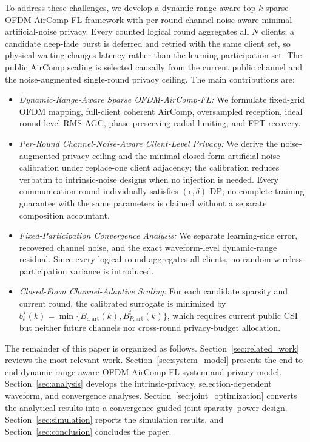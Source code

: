 \documentclass[journal]{IEEEtran}
\begin{document}
To address these challenges, we develop a dynamic-range-aware top-$k$ sparse OFDM-AirComp-FL framework with per-round channel-noise-aware minimal-artificial-noise privacy. Every counted logical round aggregates all $N$ clients; a candidate deep-fade burst is deferred and retried with the same client set, so physical waiting changes latency rather than the learning participation set. The public AirComp scaling is selected causally from the current public channel and the noise-augmented single-round privacy ceiling. The main contributions are:
\begin{itemize}
\item \emph{Dynamic-Range-Aware Sparse OFDM-AirComp-FL:} We formulate fixed-grid OFDM mapping, full-client coherent AirComp, oversampled reception, ideal round-level RMS-AGC, phase-preserving radial limiting, and FFT recovery.
\item \emph{Per-Round Channel-Noise-Aware Client-Level Privacy:} We derive the noise-augmented privacy ceiling and the minimal closed-form artificial-noise calibration under replace-one client adjacency; the calibration reduces verbatim to intrinsic-noise designs when no injection is needed. Every communication round individually satisfies $(\epsilon,\delta)$-DP; no complete-training guarantee with the same parameters is claimed without a separate composition accountant.
\item \emph{Fixed-Participation Convergence Analysis:} We separate learning-side error, recovered channel noise, and the exact waveform-level dynamic-range residual. Since every logical round aggregates all clients, no random wireless-participation variance is introduced.
\item \emph{Closed-Form Channel-Adaptive Scaling:} For each candidate sparsity and current round, the calibrated surrogate is minimized by
$ b_t^\star(k)=\min\{B_{\epsilon,\mathrm{art}}(k),B_{P,\mathrm{art}}^t(k)\}$,
which requires current public CSI but neither future channels nor cross-round privacy-budget allocation.
\end{itemize}

The remainder of this paper is organized as follows. Section~\ref{sec:related_work} reviews the most relevant work. Section~\ref{sec:system_model} presents the end-to-end dynamic-range-aware OFDM-AirComp-FL system and privacy model. Section~\ref{sec:analysis} develops the intrinsic-privacy, selection-dependent waveform, and convergence analyses. Section~\ref{sec:joint_optimization} converts the analytical results into a convergence-guided joint sparsity--power design. Section~\ref{sec:simulation} reports the simulation results, and Section~\ref{sec:conclusion} concludes the paper.
\end{document}

